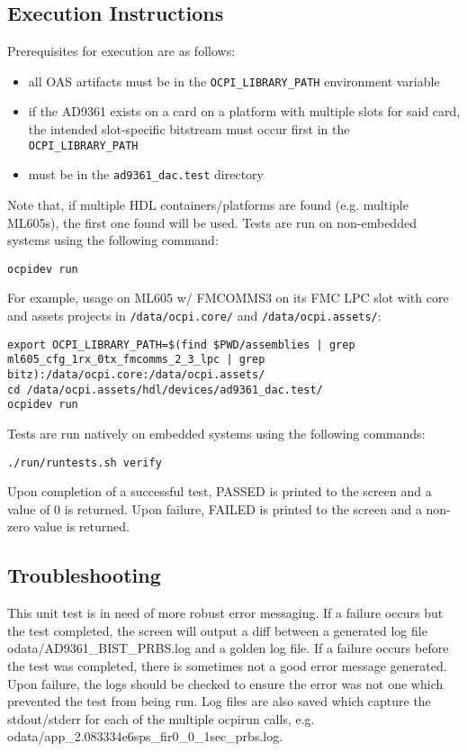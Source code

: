 \documentclass{article}
\begin{document}
\subsection*{Execution Instructions}
Prerequisites for execution are as follows:
\begin{itemize}
  \item all OAS artifacts must be in the \texttt{OCPI\_LIBRARY\_PATH} environment variable
  \item if the AD9361 exists on a card on a platform with multiple slots for said card, the intended slot-specific bitstream must occur first in the \texttt{OCPI\_LIBRARY\_PATH}
  \item must be in the \texttt{ad9361\_dac.test} directory
\end{itemize}
Note that, if multiple HDL containers/platforms are found (e.g. multiple ML605s), the first one found will be used. Tests are run on non-embedded systems using the following command:
\lstset{language=bash, columns=flexible, breaklines=true, prebreak=\space\textbackslash, basicstyle=\ttfamily, showstringspaces=false,upquote=true, aboveskip=\baselineskip, belowskip=\baselineskip}
\begin{lstlisting}
ocpidev run
\end{lstlisting}
For example, usage on ML605 w/ FMCOMMS3 on its FMC LPC slot with core and assets projects in \texttt{/data/ocpi.core/} and \texttt{/data/ocpi.assets/}:
\begin{lstlisting}
export OCPI_LIBRARY_PATH=$(find $PWD/assemblies | grep ml605_cfg_1rx_0tx_fmcomms_2_3_lpc | grep bitz):/data/ocpi.core:/data/ocpi.assets/
cd /data/ocpi.assets/hdl/devices/ad9361_dac.test/
ocpidev run
\end{lstlisting}
Tests are run natively on embedded systems using the following commands:
\begin{lstlisting}
./run/runtests.sh verify
\end{lstlisting}
Upon completion of a successful test, PASSED is printed to the screen and a value of 0 is returned. Upon failure, FAILED is printed to the screen and a non-zero value is returned.

\subsection*{Troubleshooting}
This unit test is in need of more robust error messaging. If a failure occurs but the test completed, the screen will output a diff between a generated log file odata/AD9361\_BIST\_PRBS.log and a golden log file. If a failure occurs before the test was completed, there is sometimes not a good error message generated. Upon failure, the logs should be checked to ensure the error was not one which prevented the test from being run. Log files are also saved which capture the stdout/stderr for each of the multiple ocpirun calls, e.g. odata/app\_2.083334e6sps\_fir0\_0\_1sec\_prbs.log.
\end{document}
